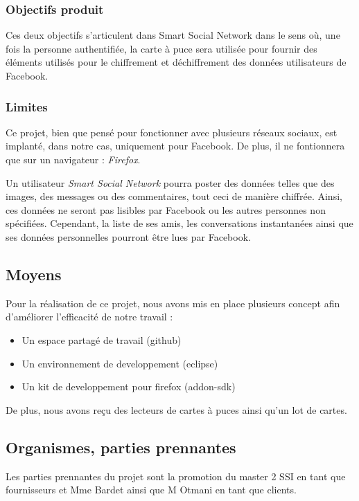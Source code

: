 \documentclass[a4paper,11pt,french]{article}
\begin{document}
\subsubsection{Objectifs produit}
	Ces deux objectifs s'articulent dans Smart Social Network dans le
sens où, une fois la personne authentifiée, la carte à puce sera utilisée
pour fournir des éléments utilisés pour le chiffrement et déchiffrement
des données utilisateurs de Facebook.

\subsubsection{Limites}
	Ce projet, bien que pensé pour fonctionner avec plusieurs réseaux
sociaux, est implanté, dans notre cas, uniquement pour Facebook. De plus,
il ne fontionnera que sur un navigateur : \emph{Firefox}.


	Un utilisateur \emph{Smart Social Network} pourra poster des données
telles que des images, des messages ou des commentaires, tout ceci de manière
chiffrée. Ainsi, ces données ne seront pas lisibles par Facebook ou les
autres personnes non spécifiées. Cependant, la liste de ses amis, les
conversations instantanées ainsi que ses données personnelles pourront être
lues par Facebook.

\subsection{Moyens}
	Pour la réalisation de ce projet, nous avons mis en place plusieurs
concept afin d'améliorer l'efficacité de notre travail :
\begin{itemize}
	\item Un espace partagé de travail (github)
	\item Un environnement de developpement (eclipse)
	\item Un kit de developpement pour firefox (addon-sdk)
\end{itemize}

	De plus, nous avons reçu des lecteurs de cartes à puces ainsi qu'un
lot de cartes.


\subsection{Organismes, parties prennantes}
	Les parties prennantes du projet sont la promotion du master 2 SSI
en tant que fournisseurs et Mme Bardet ainsi que M Otmani en tant que clients.
\end{document}
